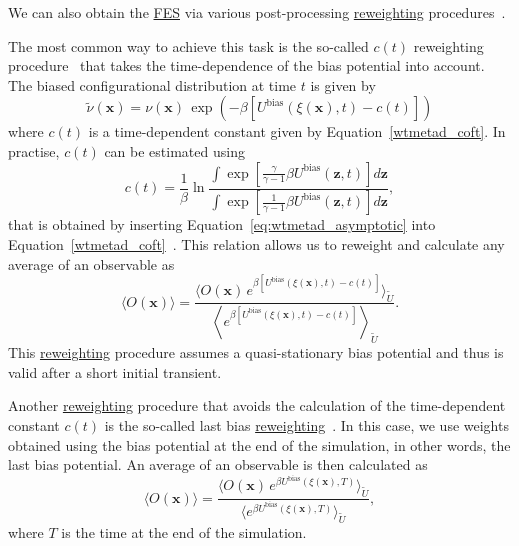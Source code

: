 \documentclass[9pt,review]{livecoms}
\newcommand{\vx}{\mathbf{x}}
\newcommand{\vz}{\mathbf{z}}
\begin{document}
We can also obtain the \hyperlink{ref:FES} {FES} via various post-processing \hyperlink{ref:Reweighting} {reweighting} procedures~\cite{bonomi_rewt,tiwary_rewt,Branduardi-JCTC-2012,Schafer_RewMetaD_2020,Giberti_IterRew_JCTC2019,10.1063/1.5123498,10.1016/j.cplett.2020.137384}.

The most common way to achieve this task is the so-called $c(t)$ reweighting procedure~\cite{bonomi_rewt,tiwary_rewt} that takes the time-dependence of the bias potential into account. The biased configurational distribution at time $t$ is given by
\begin{equation}
\tilde{\nu}(\vx) = \nu(\vx) \, \exp
\left(-\beta\left[
U^{\mathrm{bias}}(\xi(\vx),t)-c(t)
\right] \right)
\end{equation}
where $c(t)$ is a time-dependent constant given by Equation~\ref{wtmetad_coft}. In practise, $c(t)$ can be estimated using
\begin{equation}
c(t) = \frac{1}{\beta} \ln
\frac
{\int \exp \left[ \frac{\gamma}{\gamma-1} \beta U^{\mathrm{bias}}(\vz,t)  \right] d\vz }
{\int \exp \left[ \frac{1}{\gamma-1} \beta U^{\mathrm{bias}}(\vz,t)  \right] d\vz },
\end{equation}
that is obtained by inserting Equation~\ref{eq:wtmetad_asymptotic} into Equation~\ref{wtmetad_coft}~\cite{tiwary_rewt,Valsson2016_ARPC_MetaD}. This relation allows us to reweight and calculate any average of an observable as
\begin{equation}
\label{wtmetad_reweighting}
\langle O(\vx) \rangle = \frac{\langle O(\vx)
\,
e^{
\beta\left[
U^{\mathrm{bias}}(\xi(\vx),t)-c(t)
\right]}\rangle_{\tilde U}}
{\left\langle
e^{\beta \left[
U^{\mathrm{bias}}(\xi(\vx),t)-c(t)
\right]} \right\rangle_{\tilde U}}.
\end{equation}
This \hyperlink{ref:Reweighting} {reweighting} procedure assumes a quasi-stationary bias potential and thus is valid after a short initial transient.

Another \hyperlink{ref:Reweighting} {reweighting} procedure that avoids the calculation of the time-dependent constant $c(t)$ is the so-called last bias \hyperlink{ref:Reweighting} {reweighting}~\cite{Branduardi-JCTC-2012}. In this case, we use weights obtained using the bias potential at the end of the simulation, in other words, the last bias potential. An average of an observable is then calculated as
\begin{equation}
\label{wtmetad_reweighting_lastbias}
\langle O(\vx) \rangle = \frac{\langle O(\vx)
\,
e^{
\beta
U^{\mathrm{bias}}(\xi(\vx),T)
}\rangle_{\tilde U}}
{\langle
e^{\beta
U^{\mathrm{bias}}(\xi(\vx),T)
} \rangle_{\tilde U}},
\end{equation}
where $T$ is the time at the end of the simulation.
\end{document}
